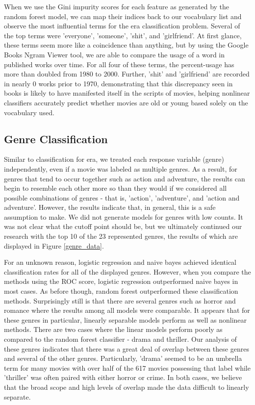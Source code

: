 \documentclass{article} %
\begin{document}
When we use the Gini impurity scores for each feature as generated by the random forest model, we can map their indices back to our vocabulary list and observe the most influential terms for the era classification problem. Several of the top terms were 'everyone', 'someone', 'shit', and 'girlfriend'. At first glance, these terms seem more like a coincidence than anything, but by using the Google Books Ngram Viewer tool, we are able to compare the usage of a word in published works over time. For all four of these terms, the percent-usage has more than doubled from 1980 to 2000. Further, 'shit' and 'girlfriend' are recorded in nearly 0 works prior to 1970, demonstrating that this discrepancy seen in books is likely to have manifested itself in the scripts of movies, helping nonlinear classifiers accurately predict whether movies are old or young based solely on the vocabulary used.

\subsection{Genre Classification}

Similar to classification for era, we treated each response variable (genre) independently, even if a movie was labeled as multiple genres. As a result, for genres that tend to occur together such as action and adventure, the results can begin to resemble each other more so than they would if we considered all possible combinations of genres - that is, 'action', 'adventure', and 'action and adventure'. However, the results indicate that, in general, this is a safe assumption to make. We did not generate models for genres with low counts. It was not clear what the cutoff point should be, but we ultimately continued our research with the top 10 of the 23 represented genres, the results of which are displayed in Figure \ref{genre_data}.

For an unknown reason, logistic regression and naive bayes achieved identical classification rates for all of the displayed genres. However, when you compare the methods using the ROC score, logistic regression outperformed naive bayes in most cases. As before though, random forest outperformed these classification methods. Surprisingly still is that there are several genres such as horror and romance where the results among all models were comparable. It appears that for these genres in particular, linearly separable models perform as well as nonlinear methods. There are two cases where the linear models perform poorly as compared to the random forest classifier - drama and thriller. Our analysis of these genres indicates that there was a great deal of overlap between these genres and several of the other genres. Particularly, 'drama' seemed to be an umbrella term for many movies with over half of the 617 movies possessing that label while 'thriller' was often paired with either horror or crime. In both cases, we believe that the broad scope and high levels of overlap made the data difficult to linearly separate.
\end{document}
